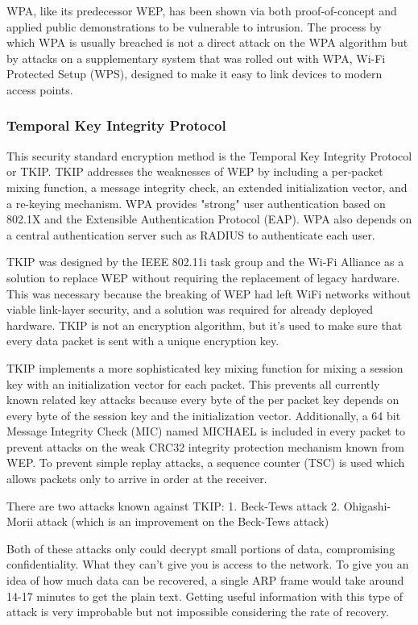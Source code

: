 \documentclass[a4paper,12pt,pagesize,headsepline,bibtotoc,titlepage]{scrartcl}
\begin{document}
WPA, like its predecessor WEP, has been shown via both proof-of-concept and applied public demonstrations to be vulnerable to intrusion. The process by which WPA is usually breached is not a direct attack on the WPA algorithm but by attacks on a supplementary system that was rolled out with WPA, Wi-Fi Protected Setup (WPS), designed to make it easy to link devices to modern access points.


\subsubsection{Temporal Key Integrity Protocol}

This security standard encryption method is the Temporal Key Integrity Protocol or TKIP. TKIP addresses the weaknesses of WEP by including a per-packet mixing function, a message integrity check, an extended initialization vector, and a re-keying mechanism. WPA provides "strong" user authentication based on 802.1X and the Extensible Authentication Protocol (EAP). WPA also depends on a central authentication server such as RADIUS to authenticate each user.

TKIP was designed by the IEEE 802.11i task group and the Wi-Fi Alliance as a solution to replace WEP without requiring the replacement of legacy hardware. This was necessary because the breaking of WEP had left WiFi networks without viable link-layer security, and a solution was required for already deployed hardware. TKIP is not an encryption algorithm, but it’s used to make sure that every data packet is sent with a unique encryption key.

TKIP implements a more sophisticated key mixing function for mixing a session key with an initialization vector for each packet. This prevents all currently known related key attacks because every byte of the per packet key depends on every byte of the session key and the initialization vector. Additionally, a 64 bit Message Integrity Check (MIC) named MICHAEL is included in every packet to prevent attacks on the weak CRC32 integrity protection mechanism known from WEP. To prevent simple replay attacks, a sequence counter (TSC) is used which allows packets only to arrive in order at the receiver.

There are two attacks known against TKIP:
1. Beck-Tews attack
2. Ohigashi-Morii attack (which is an improvement on the Beck-Tews attack)

Both of these attacks only could decrypt small portions of data, compromising confidentiality. What they can’t give you is access to the network. To give you an idea of how much data can be recovered, a single ARP frame would take around 14-17 minutes to get the plain text. Getting useful information with this type of attack is very improbable but not impossible considering the rate of recovery.
\end{document}
